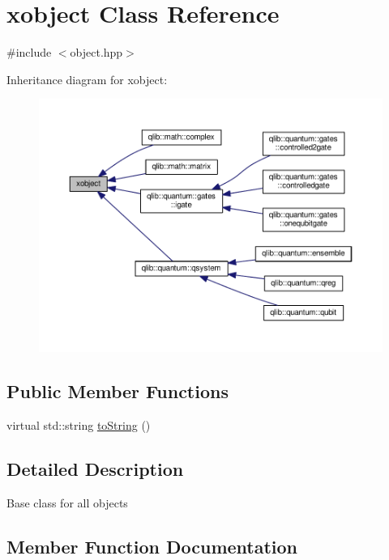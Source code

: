 \hypertarget{classxobject}{}\section{xobject Class Reference}
\label{classxobject}


{\ttfamily \#include $<$object.\+hpp$>$}



Inheritance diagram for xobject\+:\nopagebreak
\begin{figure}[H]
\begin{center}
\leavevmode
\includegraphics[width=350pt]{classxobject__inherit__graph}
\end{center}
\end{figure}
\subsection*{Public Member Functions}
\begin{DoxyCompactItemize}
\item 
virtual std\+::string \hyperlink{classxobject_ad76243a44c4e4959d3b16bb57d82600d}{to\+String} ()
\end{DoxyCompactItemize}


\subsection{Detailed Description}
Base class for all objects 

\subsection{Member Function Documentation}
